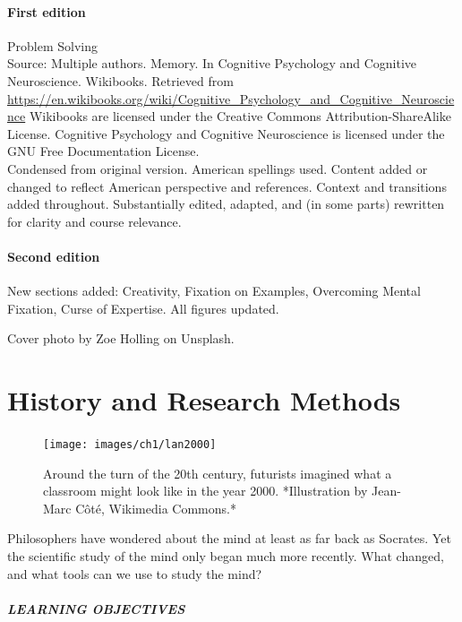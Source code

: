 \documentclass[
]{krantz}
\begin{document}
\subsubsection*{First edition}\label{first-edition-10}


Problem Solving\\
Source: Multiple authors. Memory. In Cognitive Psychology and Cognitive Neuroscience. Wikibooks. Retrieved from \url{https://en.wikibooks.org/wiki/Cognitive_Psychology_and_Cognitive_Neuroscience}
Wikibooks are licensed under the Creative Commons Attribution-ShareAlike License.
Cognitive Psychology and Cognitive Neuroscience is licensed under the GNU Free Documentation License.\\
Condensed from original version. American spellings used. Content added or changed to reflect American perspective and references. Context and transitions added throughout. Substantially edited, adapted, and (in some parts) rewritten for clarity and course relevance.

\subsubsection*{Second edition}\label{second-edition-9}


New sections added: Creativity, Fixation on Examples, Overcoming Mental Fixation, Curse of Expertise. All figures updated.

Cover photo by Zoe Holling on Unsplash.

\chapter{History and Research Methods}\label{history-and-research-methods}

\begin{figure}

{\centering \texttt{[image: images/ch1/lan2000]} 

}

\caption{Around the turn of the 20th century, futurists imagined what a classroom might look like in the year 2000. *Illustration by Jean-Marc Côté, Wikimedia Commons.*}\label{fig:lan2000}
\end{figure}

Philosophers have wondered about the mind at least as far back as Socrates. Yet the scientific study of the mind only began much more recently. What changed, and what tools can we use to study the mind?

\paragraph*{LEARNING OBJECTIVES}\label{learning-objectives}
\end{document}
